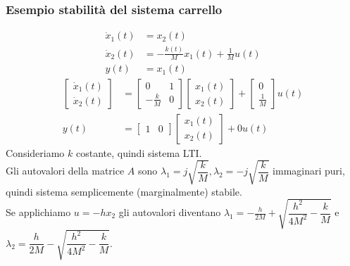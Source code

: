 \documentclass{article}
\numberwithin{equation}{subsection}
\begin{document}
\subsubsection{Esempio stabilità del sistema carrello}
\begin{align*}
    \dot x_1(t) &= x_2(t) \\
    \dot x_2(t) &= - \frac{k(t)}{M}x_1(t) + \frac{1}{M} u(t) \\
    y(t) &= x_1(t)
\end{align*}
\begin{align*}
    \begin{bmatrix}
        \dot x_1(t)\\
        \dot x_2(t)
    \end{bmatrix} &=
    \begin{bmatrix}
        0 & 1\\
        - \frac{k}{M} & 0
    \end{bmatrix}
    \begin{bmatrix}
        x_1(t)\\
        x_2(t)
    \end{bmatrix}
    +
    \begin{bmatrix}
        0\\
        \frac{1}{M}
    \end{bmatrix} u(t)
    \\
    y(t) &= \begin{bmatrix}
        1 & 0
    \end{bmatrix}
    \begin{bmatrix}
        x_1(t)\\
        x_2(t)
    \end{bmatrix} + 0 u(t)
\end{align*}
Consideriamo $k$ costante, quindi sistema LTI.\\
Gli autovalori della matrice $A$ sono $\lambda_1 = j \sqrt{\dfrac{k}{M}}, \lambda_2 = -j \sqrt{\dfrac{k}{M}}$ immaginari puri, quindi sistema semplicemente (marginalmente) stabile.
\vspace*{0.2cm}\\
Se applichiamo $u=-h x_2$ gli autovalori diventano $\lambda_1 = - \frac{h}{2M} + \sqrt{\dfrac{h^2}{4M^2}-\dfrac{k}{M}}$ e $\lambda_2 = \dfrac{h}{2M} - \sqrt{\dfrac{h^2}{4M^2}-\dfrac{k}{M}}$.\\
\end{document}
